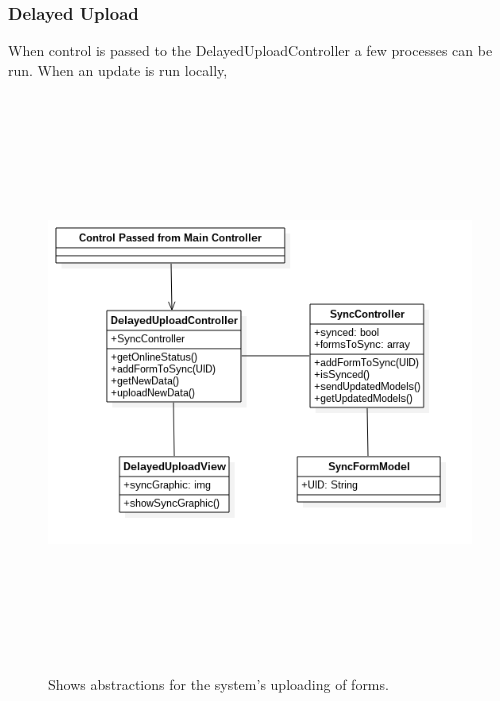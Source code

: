 \documentclass[twoside,letterpaper]{article}
\begin{document}
\subsubsection{Delayed Upload}

When control is passed to the DelayedUploadController a few processes can be run. When an update is run locally, 

\begin{figure}[H]
\centering
\includegraphics[width=6in,height=6in]{Delayed_Upload_UML.png}
\caption{Shows abstractions for the system's uploading of forms.}
\end{figure}
\end{document}
